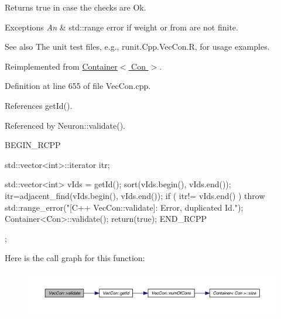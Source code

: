 \begin{DoxyReturn}{Returns}
true in case the checks are Ok.
\end{DoxyReturn}

\begin{DoxyExceptions}{Exceptions}
{\em An} & std::range error if weight or from are not finite.\\
\hline
\end{DoxyExceptions}
\begin{DoxySeeAlso}{See also}
The unit test files, e.g., runit.Cpp.VecCon.R, for usage examples. 
\end{DoxySeeAlso}


Reimplemented from \hyperlink{class_container_aa99a036fd0fe6d6b82ba558157e557d3}{Container$<$ Con $>$}.



Definition at line 655 of file VecCon.cpp.



References getId().



Referenced by Neuron::validate().


\begin{DoxyCode}
                      {
        BEGIN_RCPP

        std::vector<int>::iterator itr;

        std::vector<int> vIds = getId();
        sort(vIds.begin(), vIds.end());
        itr=adjacent_find(vIds.begin(), vIds.end());
        if ( itr!= vIds.end() )  throw std::range_error("[C++ VecCon::validate]: 
      Error, duplicated Id.");
        Container<Con>::validate();
        return(true);
        END_RCPP

};
\end{DoxyCode}


Here is the call graph for this function:
\nopagebreak
\begin{figure}[H]
\begin{center}
\leavevmode
\includegraphics[width=400pt]{class_vec_con_af008396d3982fb7ccf1af9618b89937c_cgraph}
\end{center}
\end{figure}




